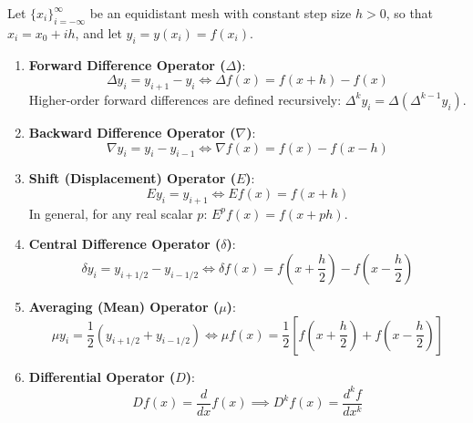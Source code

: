 \begin{theorembox}
Let $\{x_i\}_{i=-\infty}^\infty$ be an equidistant mesh with constant step size $h > 0$, so that $x_i = x_0 + ih$, and let $y_i = y(x_i) = f(x_i)$.
\begin{enumerate}
    \item \textbf{Forward Difference Operator ($\Delta$)}:
    \begin{equation}
        \boxed{\Delta y_i = y_{i+1} - y_i \iff \Delta f(x) = f(x + h) - f(x)}
    \end{equation}
    Higher-order forward differences are defined recursively: $\Delta^k y_i = \Delta(\Delta^{k-1} y_i)$.
    \item \textbf{Backward Difference Operator ($\nabla$)}:
    \begin{equation}
        \boxed{\nabla y_i = y_i - y_{i-1} \iff \nabla f(x) = f(x) - f(x - h)}
    \end{equation}
    \item \textbf{Shift (Displacement) Operator ($E$)}:
    \begin{equation}
        \boxed{E y_i = y_{i+1} \iff E f(x) = f(x + h)}
    \end{equation}
    In general, for any real scalar $p$: $E^p f(x) = f(x + p h)$.
    \item \textbf{Central Difference Operator ($\delta$)}:
    \begin{equation}
        \boxed{\delta y_i = y_{i+1/2} - y_{i-1/2} \iff \delta f(x) = f\left(x + \frac{h}{2}\right) - f\left(x - \frac{h}{2}\right)}
    \end{equation}
    \item \textbf{Averaging (Mean) Operator ($\mu$)}:
    \begin{equation}
        \boxed{\mu y_i = \frac{1}{2}\left(y_{i+1/2} + y_{i-1/2}\right) \iff \mu f(x) = \frac{1}{2}\left[ f\left(x + \frac{h}{2}\right) + f\left(x - \frac{h}{2}\right) \right]}
    \end{equation}
    \item \textbf{Differential Operator ($D$)}:
    \begin{equation}
        \boxed{D f(x) = \frac{d}{dx}f(x) \implies D^k f(x) = \frac{d^k f}{dx^k}}
    \end{equation}
\end{enumerate}
\end{theorembox}


